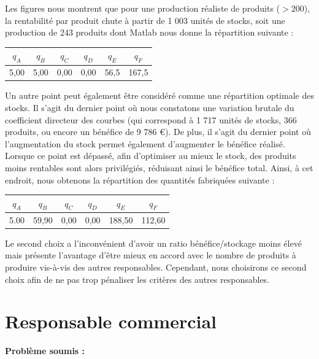 \documentclass[paper=a4, fontsize=11pt]{report}
\numberwithin{equation}{section}		%
\numberwithin{figure}{section}			%
\numberwithin{table}{section}				%
\renewcommand{\bf}[1]{\textbf{#1}}
\begin{document}
Les figures nous montrent que pour une production réaliste de produits ($> 200$), la rentabilité par produit chute à partir de 1 003 unités de stocks, soit une production de 243 produits dont Matlab nous donne la répartition suivante :

\begin{center}
\begin{tabular}{cccccc}
\hline 
$q_A$ & $q_B$ & $q_C$ & $q_D$ & $q_E$ & $q_F$ \\ 
\hline 
5,00 & 5,00 & 0,00 & 0,00 & 56,5 & 167,5 \\ 
\hline 
\end{tabular} 
\end{center}

Un autre point peut également être considéré comme une répartition optimale des stocks. Il s'agit du dernier point où nous constatons une variation brutale du coefficient directeur des courbes (qui correspond à 1 717 unités de stocks, 366 produits, ou encore un bénéfice de 9 786 €). De plus, il s'agit du dernier point où l'augmentation du stock permet également d'augmenter le bénéfice réalisé. Lorsque ce point est dépassé, afin d'optimiser au mieux le stock, des produits moins rentables sont alors privilégiés, réduisant ainsi le bénéfice total. Ainsi, à cet endroit, nous obtenons la répartition des quantités fabriquées suivante :

\begin{center}
\begin{tabular}{cccccc}
\hline 
$q_A$ & $q_B$ & $q_C$ & $q_D$ & $q_E$ & $q_F$ \\ 
\hline 
5.00 & 59,90 & 0,00 & 0,00 & 188,50 & 112,60 \\ 
\hline 
\end{tabular} 
\end{center}

Le second choix a l'inconvénient d'avoir un ratio bénéfice/stockage moins élevé mais présente l'avantage d'être mieux en accord avec le nombre de produits à produire vis-à-vis des autres responsables. Cependant, nous choisirons ce second choix afin de ne pas trop pénaliser les critères des autres responsables.

\section{Responsable commercial}
\bf{Problème soumis :}
\end{document}
